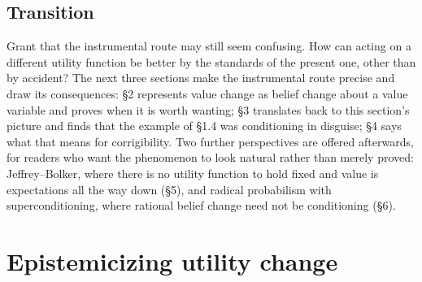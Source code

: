 \documentclass[11pt,a4paper]{article}
\begin{document}
\subsection{Transition}
Grant that the instrumental route may still seem confusing. How can acting on a different utility function be better by the standards of the present one, other than by accident? The next three sections make the instrumental route precise and draw its consequences: \S2 represents value change as belief change about a value variable and proves when it is worth wanting; \S3 translates back to this section's picture and finds that the example of \S1.4 was conditioning in disguise; \S4 says what that means for corrigibility. Two further perspectives are offered afterwards, for readers who want the phenomenon to look natural rather than merely proved: Jeffrey--Bolker, where there is no utility function to hold fixed and value is expectations all the way down (\S5), and radical probabilism with superconditioning, where rational belief change need not be conditioning (\S6).

\section{Epistemicizing utility change}
\end{document}
